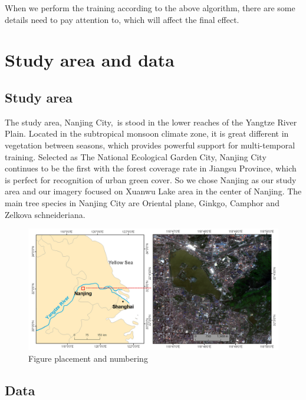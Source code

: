 \documentclass{isprs} %
\begin{document}
When we perform the training according to the above algorithm, there are some details need to pay attention to, which will affect the final effect. 

\section{Study area and data}\label{sec:Study area and data}

\subsection{Study area}\label{sec:Study area}

The study area, Nanjing City, is stood in the lower reaches of the Yangtze River Plain. Located in the subtropical monsoon climate zone, it is great different in vegetation between seasons, which provides powerful support for multi-temporal training. Selected as The National Ecological Garden City, Nanjing City continues to be the first with the forest coverage rate in Jiangsu Province, which is perfect for recognition of urban green cover. So we chose Nanjing as our study area and our imagery focused on Xuanwu Lake area in the center of Nanjing. The main tree species in Nanjing City are Oriental plane, Ginkgo, Camphor and Zelkova schneideriana.

\begin{figure}[ht!]
	\begin{center}
			\includegraphics[width=2.0\columnwidth]{figures/images/studyArea.png}
		\caption{Figure placement and numbering}
	\label{fig:studyArea}
	\end{center}
\end{figure}

\subsection{Data}\label{sec:Data}
\end{document}
